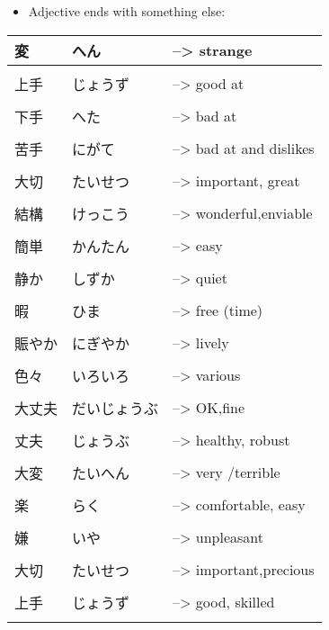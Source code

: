 \documentclass{article}
\begin{document}
\begin{itemize}
\item Adjective ends with something else: \\
\end{itemize}
\begin{tabular}{ p{1.41cm} | p{3.4cm} l }
変&へん&--> strange \\ \hline\\[-1em]
上手&じょうず&--> good at \\ \hline\\[-1em]
下手&へた&--> bad at \\ \hline\\[-1em]
苦手&にがて&--> bad at and dislikes \\ \hline\\[-1em]
大切 &たいせつ&--> important, great\\ \hline\\[-1em]
結構 &けっこう&--> wonderful,enviable\\ \hline\\[-1em]
簡単 &かんたん&--> easy\\ \hline\\[-1em]
静か&しずか&--> quiet\\ \hline\\[-1em]
暇&ひま&--> free (time)\\ \hline\\[-1em]
賑やか&にぎやか&--> lively\\ \hline\\[-1em]
色々&いろいろ&--> various\\ \hline\\[-1em]
大丈夫&だいじょうぶ&--> OK,fine\\ \hline\\[-1em]
丈夫&じょうぶ&--> healthy, robust\\ \hline\\[-1em]
大変&たいへん&--> very /terrible\\ \hline\\[-1em]
楽 &らく&--> comfortable, easy\\ \hline\\[-1em]
嫌 &いや&--> unpleasant\\ \hline\\[-1em]
大切 &たいせつ&--> important,precious\\ \hline\\[-1em]
上手&じょうず&--> good, skilled\\ \hline\\[-1em]

\end{tabular}
\end{document}
